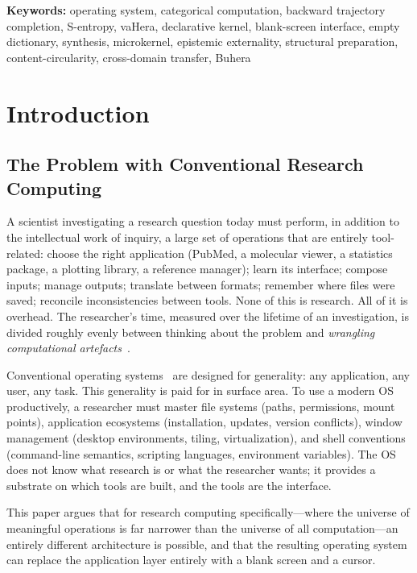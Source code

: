 \documentclass[11pt,twocolumn,a4paper]{article}
\begin{document}
\vspace{6pt}
\noindent\textbf{Keywords:} operating system, categorical computation, backward trajectory completion, S-entropy, vaHera, declarative kernel, blank-screen interface, empty dictionary, synthesis, microkernel, epistemic externality, structural preparation, content-circularity, cross-domain transfer, Buhera

\tableofcontents

\section{Introduction}
\label{sec:introduction}

\subsection{The Problem with Conventional Research Computing}

A scientist investigating a research question today must perform, in addition to the intellectual work of inquiry, a large set of operations that are entirely tool-related: choose the right application (PubMed, a molecular viewer, a statistics package, a plotting library, a reference manager); learn its interface; compose inputs; manage outputs; translate between formats; remember where files were saved; reconcile inconsistencies between tools. None of this is research. All of it is overhead. The researcher's time, measured over the lifetime of an investigation, is divided roughly evenly between thinking about the problem and \emph{wrangling computational artefacts}~\cite{wilson2014best,kanza2017electronic}.

Conventional operating systems~\cite{tanenbaum2015modern,silberschatz2018operating,ritchie1974unix} are designed for generality: any application, any user, any task. This generality is paid for in surface area. To use a modern OS productively, a researcher must master file systems (paths, permissions, mount points), application ecosystems (installation, updates, version conflicts), window management (desktop environments, tiling, virtualization), and shell conventions (command-line semantics, scripting languages, environment variables). The OS does not know what research is or what the researcher wants; it provides a substrate on which tools are built, and the tools are the interface.

This paper argues that for research computing specifically---where the universe of meaningful operations is far narrower than the universe of all computation---an entirely different architecture is possible, and that the resulting operating system can replace the application layer entirely with a blank screen and a cursor.
\end{document}
